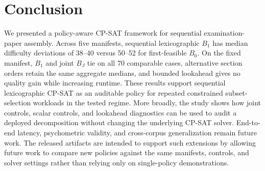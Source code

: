 \documentclass[runningheads]{llncs}
\begin{document}
\section{Conclusion}
\label{sec:conclusion}
We presented a policy-aware CP-SAT framework for sequential examination-paper assembly. Across five manifests, sequential lexicographic $B_1$ has median difficulty deviations of 38--40 versus 50--52 for first-feasible $B_0$. On the fixed manifest, $B_1$ and joint $B_J$ tie on all 70 comparable cases, alternative section orders retain the same aggregate medians, and bounded lookahead gives no quality gain while increasing runtime. These results support sequential lexicographic CP-SAT as an auditable policy for repeated constrained subset-selection workloads in the tested regime. More broadly, the study shows how joint controls, scalar controls, and lookahead diagnostics can be used to audit a deployed decomposition without changing the underlying CP-SAT solver. End-to-end latency, psychometric validity, and cross-corpus generalization remain future work.
The released artifacts are intended to support such extensions by allowing future work to compare new policies against the same manifests, controls, and solver settings rather than relying only on single-policy demonstrations.
\end{document}
